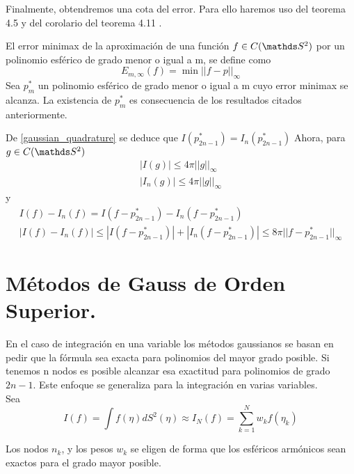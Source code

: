 Finalmente, obtendremos una cota del error. Para ello haremos uso del teorema 4.5 \cite[p.142]{libro_esfarm} y del corolario del teorema 4.11 \cite[p.149]{libro_esfarm}.
\medskip

El error minimax de la aproximación de una función $f\in C(\esfera)$ por un polinomio esférico de grado menor o igual a m, se define como 
$$
E_{m,\infty}(f) = \min ||f-p||_{\infty}
$$
Sea $p_m^*$ un polinomio esférico de grado menor o igual a m cuyo error minimax se alcanza. La existencia de $p_m^*$ es consecuencia de los resultados citados anteriormente.
\medskip

De \ref{gaussian_quadrature} se deduce que $I(p_{2n-1}^*)=I_n(p_{2n-1}^*)$
Ahora, para $g\in C(\esfera)$
\begin{gather}
|I(g)| \le 4\pi||g||_\infty \\
|I_n(g)|\le 4\pi||g||_\infty
\end{gather}
y
\begin{gather}
I(f) - I_n(f) = I(f-p^*_{2n-1}) - I_n(f-p^*_{2n-1}) \\
|I(f) - I_n(f)| \le | I(f-p^*_{2n-1}) | + |  I_n(f-p^*_{2n-1}) | \le 8\pi||f-p^*_{2n-1}||_\infty
\end{gather}
\section{Métodos de Gauss de Orden Superior.}

En el caso de integración en una variable los métodos gaussianos se basan en pedir que la fórmula sea exacta para polinomios del mayor grado posible. Si tenemos n nodos es posible alcanzar esa exactitud para polinomios de grado $2n-1$. Este enfoque se generaliza para la integración en varias variables. \\
Sea $$
I(f)= \int f(\eta)dS^2(\eta) \approx I_N(f) = \sum_{k=1}^{N} w_kf(\eta_k)$$

Los nodos ${n_k}$, y los pesos ${w_k}$ se eligen de forma que los esféricos armónicos sean exactos para el grado mayor posible.

